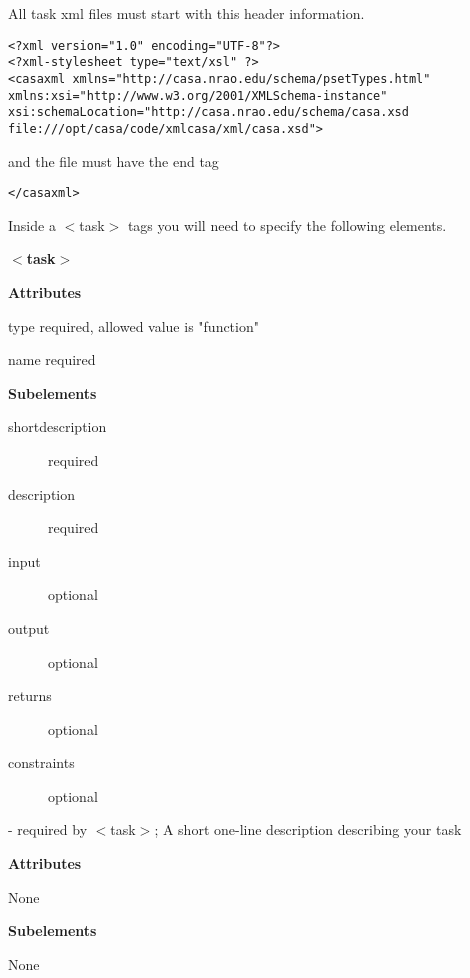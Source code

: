 All task xml files must start with this header information.
\begin{verbatim}
<?xml version="1.0" encoding="UTF-8"?>
<?xml-stylesheet type="text/xsl" ?>
<casaxml xmlns="http://casa.nrao.edu/schema/psetTypes.html"
xmlns:xsi="http://www.w3.org/2001/XMLSchema-instance"
xsi:schemaLocation="http://casa.nrao.edu/schema/casa.xsd
file:///opt/casa/code/xmlcasa/xml/casa.xsd">

\end{verbatim}
and the file must have the end tag
\begin{verbatim}
</casaxml>
\end{verbatim}
Inside a $<$task$>$ tags you will need to specify the following elements.
\begin{description}
\item \textbf{$<$task$>$}
\begin{description}
\item \textbf{Attributes}
\begin{description}
\item {type}  required, allowed value is "function"
\item {name}  required 
\end{description}
\item \textbf{Subelements}
\begin{description}
\item [shortdescription] required
\item [description]  required
\item [input]  optional
\item [output]  optional
\item [returns] optional
\item [constraints]  optional
\end{description}
\end{description}
\item [$<$shortdescription$>$] - required by $<$task$>$; A short one-line description describing your task
\begin{description}
\item \textbf{Attributes}
\begin{description}
\item None
\end{description}
\item \textbf{Subelements}
\begin{description}
\item None
\end{description}
\end{description}

\end{description}
